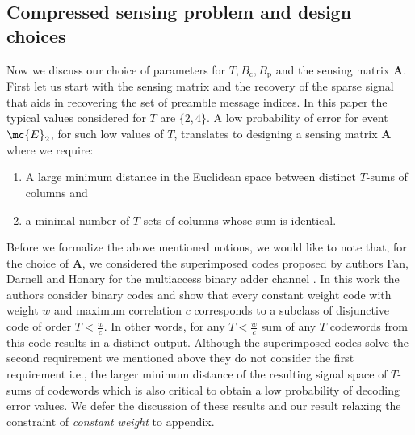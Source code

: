 \documentclass[final,onecolumn,12pt]{IEEEtran}
\begin{document}
\subsection{Compressed sensing problem and design choices}
Now we discuss our choice of parameters for $T, B_\mathrm{c}, B_\mathrm{p}$ and the sensing matrix $\mathbf{A}$. First let us start with the sensing matrix and the recovery of the sparse signal that aids in recovering the set of preamble message indices. In this paper the typical values considered for $T$  are $\{2,4\}$. A low probability of error for event $\mc{E}_2$, for such low values of $T$, translates to  designing a sensing matrix $\mathbf{A}$ where we require: 
\begin{enumerate}
\item A large minimum distance in the Euclidean space between distinct $T$-sums of columns and 
\item a minimal number of $T$-sets of columns whose sum is identical.
\end{enumerate} 
Before we formalize the above mentioned notions, we would like to note that, for the choice of $\mathbf{A}$, we considered the superimposed codes proposed by authors Fan, Darnell and Honary for the multiaccess binary adder channel \cite{fan1995superimposed}. In this work the authors consider binary codes and show that every constant weight code with weight $w$ and maximum correlation $c$ corresponds to a subclass of disjunctive code of order $T<\frac{w}{c}$. In other words, for any $T<\frac{w}{c}$ sum of any $T$ codewords from this code results in a distinct output. Although the superimposed codes solve the second requirement we mentioned above they do not consider the first requirement i.e., the larger minimum distance of the resulting signal space of $T$-sums of codewords which is also critical to obtain a low probability of decoding error values. We defer the discussion of these results and our result relaxing the constraint of \textit{constant weight} to appendix.
\end{document}
